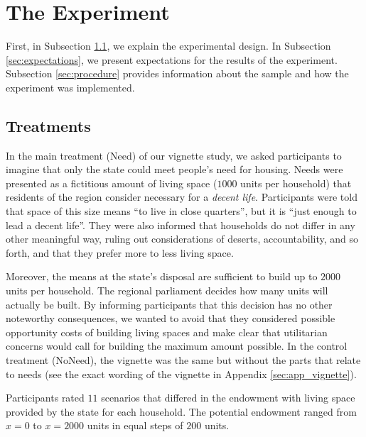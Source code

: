 \documentclass[12pt]{scrartcl}
\begin{document}
\section{The Experiment}\label{sec:experiment}
First, in Subsection \ref{sec:treatments}, we explain the experimental design.
In Subsection \ref{sec:expectations}, we present expectations for the results of the experiment.
Subsection \ref{sec:procedure} provides information about the sample and how the experiment was implemented.


\subsection{Treatments}\label{sec:treatments}
In the main treatment (Need) of our vignette study, we asked participants to imagine that only the state could meet people's need for housing.
Needs were presented as a fictitious amount of living space ($1000$ units per household) that residents of the region consider necessary for a \textit{decent life}.
Participants were told that space of this size means ``to live in close quarters'', but it is ``just enough to lead a decent life''.
They were also informed that households do not differ in any other meaningful way, ruling out considerations of deserts, accountability, and so forth, and that they prefer more to less living space.

Moreover, the means at the state's disposal are sufficient to build up to $2000$ units per household.
The regional parliament decides how many units will actually be built.
By informing participants that this decision has no other noteworthy consequences, we wanted to avoid that they considered possible opportunity costs of building living spaces and make clear that utilitarian concerns would call for building the maximum amount possible.
In the control treatment (NoNeed), the vignette was the same but without the parts that relate to needs (see the exact wording of the vignette in Appendix \ref{sec:app_vignette}).

Participants rated $11$ scenarios that differed in the endowment with living space provided by the state for each household.
The potential endowment ranged from $x=0$ to $x=2000$ units in equal steps of $200$ units.
\end{document}
